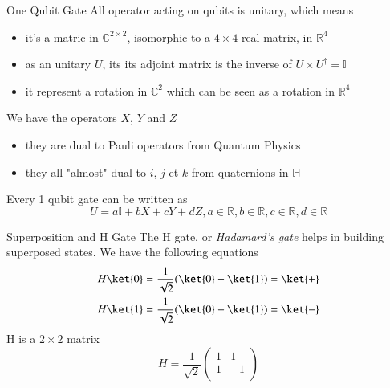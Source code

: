 \begin{frame}{One Qubit Gate}
All operator acting on qubits is unitary, which means
\begin{itemize}
    \item it's a matric in $\mathbb{C}^{2 \times 2}$, isomorphic to a  $4\times4$ real matrix, in
    $\mathbb{R}^4$
    \item as an unitary $U$, its  its adjoint matrix is the inverse of $U \times U^{\dag} = \mathbb{I}$ 
    \item it represent a rotation in $\mathbb{C}^2$ which can be seen as a rotation in $\mathbb{R}^4$
\end{itemize}
We have the operators $X$, $Y$ and $Z$
\begin{itemize}
    \item they are dual to Pauli operators from Quantum Physics
    \item they all "almost" dual to $i$, $j$ et $k$ from quaternions in $\mathbb{H}$
\end{itemize}
Every 1 qubit gate can be written as
\begin{equation*}
    U = a\mathbb{I} + bX + cY + dZ, a \in \mathbb{R}, b \in \mathbb{R}, c \in \mathbb{R}, d \in \mathbb{R}
\end{equation*}
\end{frame}

\begin{frame}{Superposition and H Gate}
The H gate, or \textit{Hadamard's gate} helps in building superposed states. \newline \newline
We have the following equations
\begin{equation}
\begin{split}
    H\ket{0} &= \frac{1}{\sqrt{2}}(\ket{0}+\ket{1}) = \ket{+}\\
    H\ket{1} &= \frac{1}{\sqrt{2}}(\ket{0}-\ket{1}) = \ket{-}
\end{split}
\end{equation}
H is a  $2\times 2$ matrix
\begin{equation*}
    H = \frac{1}{\sqrt{2}}\begin{pmatrix}
                           1 & 1 \\
                           1 & -1 \\
                          \end{pmatrix}
\end{equation*}
\end{frame}

